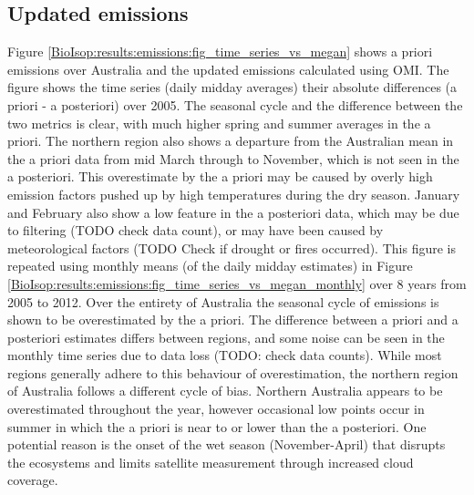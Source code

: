   \subsection{Updated emissions}
    \label{BioIsop:results:emissions}
    
    Figure \ref{BioIsop:results:emissions:fig_time_series_vs_megan} shows a priori emissions over Australia and the updated emissions calculated using OMI.
    The figure shows the time series (daily midday averages) their absolute differences (a priori - a posteriori) over 2005.
    The seasonal cycle and the difference between the two metrics is clear, with much higher spring and summer averages in the a priori.
    The northern region also shows a departure from the Australian mean in the a priori data from mid March through to November, which is not seen in the a posteriori.
    This overestimate by the a priori may be caused by overly high emission factors pushed up by high temperatures during the dry season.
    January and February also show a low feature in the a posteriori data, which may be due to filtering (TODO check data count), or may have been caused by meteorological factors (TODO Check if drought or fires occurred).
    This figure is repeated using monthly means (of the daily midday estimates) in Figure \ref{BioIsop:results:emissions:fig_time_series_vs_megan_monthly} over 8 years from 2005 to 2012.
    Over the entirety of Australia the seasonal cycle of emissions is shown to be overestimated by the a priori.
    The difference between a priori and a posteriori estimates differs between regions, and some noise can be seen in the monthly time series due to data loss (TODO: check data counts).
    While most regions generally adhere to this behaviour of overestimation, the northern region of Australia follows a different cycle of bias.
    Northern Australia appears to be overestimated throughout the year, however occasional low points occur in summer in which the a priori is near to or lower than the a posteriori.
    One potential reason is the onset of the wet season (November-April) that disrupts the ecosystems and limits satellite measurement through increased cloud coverage.
    
    
